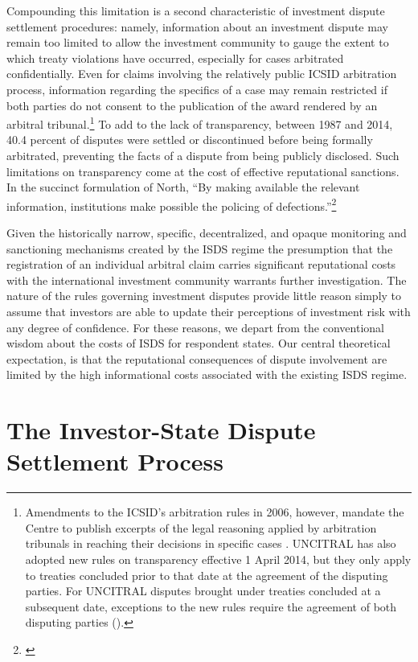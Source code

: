 \documentclass[12pt,onesided]{amsart}
\begin{document}
Compounding this limitation is a second characteristic of investment dispute settlement procedures: namely, information about an investment dispute may remain too limited to allow the investment community to gauge the extent to which treaty violations have occurred, especially for cases arbitrated confidentially. Even for claims involving the relatively public ICSID arbitration process, information regarding the specifics of a case may remain restricted if both parties do not consent to the publication of the award rendered by an arbitral tribunal.\footnote{Amendments to the ICSID's arbitration rules in 2006, however, mandate the Centre to publish excerpts of the legal reasoning applied by arbitration tribunals in reaching their decisions in specific cases \citep{antonietti:2006}. UNCITRAL has also adopted new rules on transparency effective 1 April 2014, but they only apply to treaties concluded prior to that date at the agreement of the disputing parties. For UNCITRAL disputes brought under treaties concluded at a subsequent date, exceptions to the new rules require the agreement of both disputing parties (\citealp[p. 33--40]{uncitral:2013}).} To add to the lack of transparency, between 1987 and 2014, 40.4 percent of disputes were settled or discontinued before being formally arbitrated, preventing the facts of a dispute from being publicly disclosed. Such limitations on transparency come at the cost of effective reputational sanctions. In the succinct formulation of North, ``By making available the relevant information, institutions make possible the policing of defections.''\footnote{\citet[p. 57]{north1990institutions}} 

Given the historically narrow, specific, decentralized, and opaque monitoring and sanctioning mechanisms created by the ISDS regime the presumption that the registration of an individual arbitral claim carries significant reputational costs with the international investment community warrants further investigation. The nature of the rules governing investment disputes provide little reason simply to assume that investors are able to update their perceptions of investment risk with any degree of confidence. For these reasons, we depart from the conventional wisdom about the costs of ISDS for respondent states. Our central theoretical expectation, is that the reputational consequences of dispute involvement are limited by the high informational costs associated with the existing ISDS regime. 

\section*{The Investor-State Dispute Settlement Process}
\end{document}
